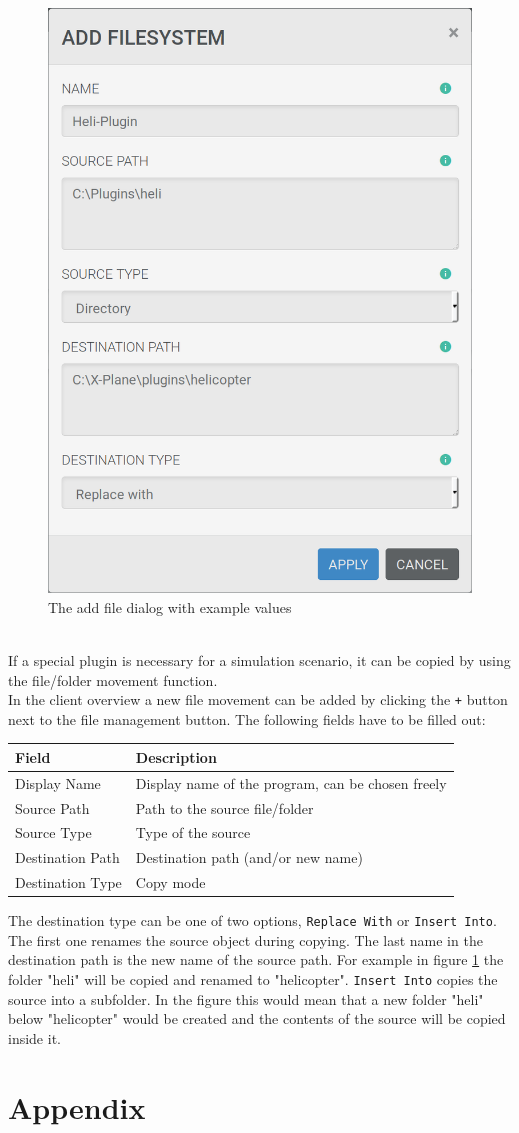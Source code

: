 \documentclass[accentcolor=tud1c, paper=a4, colorback]{tudreport}
\begin{document}
	\begin{figure}[h]
		\centering
		\label{add_filesystem}
		\includegraphics[width=.4\textwidth]{add_filesystem}
		\caption{The add file dialog with example values}
	\end{figure}
	\\
	If a special plugin is necessary for a simulation scenario, it can be copied by using
	the file/folder movement function.
	\\
	In the client overview a new file movement can be added by clicking the \texttt{+} button
	next to the file management button. The following fields have to be filled out:
	\\
	\begin{center}
	\begin{tabular}{l|l}
		Field & Description \\\hline
		Display Name &  Display name of the program, can be chosen freely\\
		Source Path & Path to the source file/folder\\
		Source Type & Type of the source\\
		Destination Path & Destination path (and/or new name)\\
		Destination Type & Copy mode\\
	\end{tabular}
	\end{center}
	The destination type can be one of two options, \texttt{Replace With} or \texttt{Insert Into}.
	The first one renames the source object during copying. The last name in the destination path
	is the new name of the source path. For example in figure \ref{add_filesystem} the folder 
	"heli" will be copied and renamed to "helicopter".
	\texttt{Insert Into} copies the source into a subfolder. In the figure this would mean that
	a new folder "heli" below "helicopter" would be created and the contents of the source will
	be copied inside it.

	\chapter{Appendix}

	\clearpage
	\printindex
\end{document}
